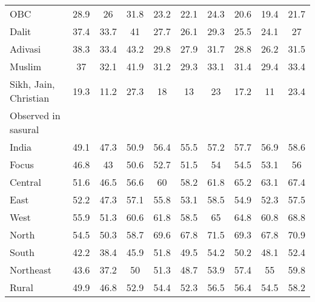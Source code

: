\begin{tabular}{l*{9}{c}}
OBC                 &        28.9&          26&        31.8&        23.2&        22.1&        24.3&        20.6&        19.4&        21.7\\
Dalit               &        37.4&        33.7&          41&        27.7&        26.1&        29.3&        25.5&        24.1&          27\\
Adivasi             &        38.3&        33.4&        43.2&        29.8&        27.9&        31.7&        28.8&        26.2&        31.5\\
Muslim              &          37&        32.1&        41.9&        31.2&        29.3&        33.1&        31.4&        29.4&        33.4\\
Sikh, Jain, Christian&        19.3&        11.2&        27.3&          18&          13&          23&        17.2&          11&        23.4\\
\midrule
Observed in sasural &            &            &            &            &            &            &            &            &            \\
India               &        49.1&        47.3&        50.9&        56.4&        55.5&        57.2&        57.7&        56.9&        58.6\\
Focus               &        46.8&          43&        50.6&        52.7&        51.5&          54&        54.5&        53.1&          56\\
Central             &        51.6&        46.5&        56.6&          60&        58.2&        61.8&        65.2&        63.1&        67.4\\
East                &        52.2&        47.3&        57.1&        55.8&        53.1&        58.5&        54.9&        52.3&        57.5\\
West                &        55.9&        51.3&        60.6&        61.8&        58.5&          65&        64.8&        60.8&        68.8\\
North               &        54.5&        50.3&        58.7&        69.6&        67.8&        71.5&        69.3&        67.8&        70.9\\
South               &        42.2&        38.4&        45.9&        51.8&        49.5&        54.2&        50.2&        48.1&        52.4\\
Northeast           &        43.6&        37.2&          50&        51.3&        48.7&        53.9&        57.4&          55&        59.8\\
Rural               &        49.9&        46.8&        52.9&        54.4&        52.3&        56.5&        56.4&        54.5&        58.2\\

\end{tabular}
